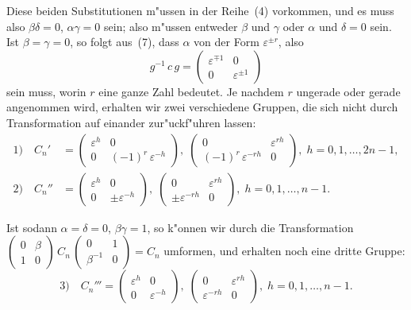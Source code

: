 \documentclass[12pt,a4paper]{article}
\theoremstyle{plain}
\theoremstyle{definition}
\theoremstyle{remark}
\begin{document}
Diese beiden Substitutionen m"ussen in der Reihe~(4) vorkommen, und es muss also $\beta\delta = 0$, $\alpha\gamma = 0$ sein; also m"ussen entweder $\beta$ und $\gamma$ oder $\alpha$ und $\delta = 0$ sein. Ist $\beta = \gamma = 0$, so folgt aus~(7), dass $\alpha$ von der Form $\varepsilon^{\pm r}$, also
\[
g^{-1}\,c\,g = \begin{pmatrix} \varepsilon^{\mp 1} & 0 \\ 0 & \varepsilon^{\pm 1} \end{pmatrix}
\]
sein muss, worin $r$ eine ganze Zahl bedeutet. Je nachdem $r$ ungerade oder gerade angenommen wird, erhalten wir zwei verschiedene Gruppen, die sich nicht durch Transformation auf einander zur"uckf"uhren lassen:
\begin{equation}\tag{8}
\begin{aligned}
\text{1)}\quad C_{n}' &= \begin{pmatrix} \varepsilon^{h} & 0 \\ 0 & (-1)^{r}\,\varepsilon^{-h} \end{pmatrix},\;
\begin{pmatrix} 0 & \varepsilon^{rh} \\ (-1)^{r}\,\varepsilon^{-rh} & 0 \end{pmatrix},\; h = 0, 1, \ldots, 2n-1, \\
\text{2)}\quad C_{n}'' &= \begin{pmatrix} \varepsilon^{h} & 0 \\ 0 & \pm\varepsilon^{-h} \end{pmatrix},\;
\begin{pmatrix} 0 & \varepsilon^{rh} \\ \pm\varepsilon^{-rh} & 0 \end{pmatrix},\; h = 0, 1, \ldots, n-1.
\end{aligned}
\end{equation}

Ist sodann $\alpha = \delta = 0$, $\beta\gamma = 1$, so k"onnen wir durch die Transformation $\begin{pmatrix} 0 & \beta \\ 1 & 0 \end{pmatrix}\,C_{n}\,\begin{pmatrix} 0 & 1 \\ \beta^{-1} & 0 \end{pmatrix} = C_{n}$ umformen, und erhalten noch eine dritte Gruppe:
\begin{equation}\tag{9}
\text{3)}\quad C_{n}''' = \begin{pmatrix} \varepsilon^{h} & 0 \\ 0 & \varepsilon^{-h} \end{pmatrix},\;
\begin{pmatrix} 0 & \varepsilon^{rh} \\ \varepsilon^{-rh} & 0 \end{pmatrix},\; h = 0, 1, \ldots, n-1.
\end{equation}
\end{document}
